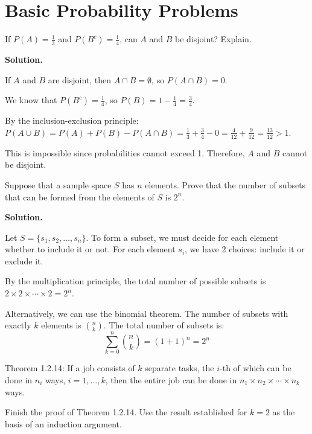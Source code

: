 \section{Basic Probability Problems}

\begin{problembox}
If $P(A) = \frac{1}{3}$ and $P(B^c) = \frac{1}{4}$, can $A$ and $B$ be disjoint? Explain.
\end{problembox}

\noindent\textbf{Solution.}

If $A$ and $B$ are disjoint, then $A \cap B = \emptyset$, so $P(A \cap B) = 0$.

We know that $P(B^c) = \frac{1}{4}$, so $P(B) = 1 - \frac{1}{4} = \frac{3}{4}$.

By the inclusion-exclusion principle: $P(A \cup B) = P(A) + P(B) - P(A \cap B) = \frac{1}{3} + \frac{3}{4} - 0 = \frac{4}{12} + \frac{9}{12} = \frac{13}{12} > 1$.

This is impossible since probabilities cannot exceed 1. Therefore, $A$ and $B$ cannot be disjoint.


\begin{problembox}
Suppose that a sample space $S$ has $n$ elements. Prove that the number of subsets that can be formed from the elements of $S$ is $2^n$.
\end{problembox}

\noindent\textbf{Solution.}

Let $S = \{s_1, s_2, \ldots, s_n\}$. To form a subset, we must decide for each element whether to include it or not. For each element $s_i$, we have 2 choices: include it or exclude it.

By the multiplication principle, the total number of possible subsets is $2 \times 2 \times \cdots \times 2 = 2^n$.

Alternatively, we can use the binomial theorem. The number of subsets with exactly $k$ elements is $\binom{n}{k}$. The total number of subsets is:
\[ \sum_{k=0}^{n} \binom{n}{k} = (1 + 1)^n = 2^n \]


\begin{problembox}
Theorem 1.2.14: If a job consists of $k$ separate tasks, the $i$-th of which can be done in $n_{i}$ ways, $i=1,\ldots,k$, then the entire job can be done in $n_{1} \times n_{2} \times \cdots \times n_{k}$ ways.

Finish the proof of Theorem 1.2.14. Use the result established for $k = 2$ as the basis of an induction argument.

\end{problembox}

